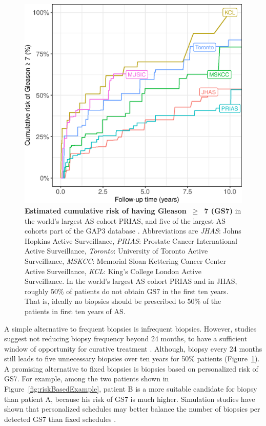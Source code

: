 \begin{figure}[!htb]
\centerline{\includegraphics[width=\columnwidth]{images/npmle_plot.eps}}
\caption{\textbf{Estimated cumulative risk of having Gleason~$\geq$~7 (GS7)} in the world's largest AS cohort PRIAS, and five of the largest AS cohorts part of the GAP3 database \citep{gap3_2018}. Abbreviations are \textit{JHAS}: Johns Hopkins Active Surveillance, \textit{PRIAS}: Prostate Cancer International Active Surveillance, \textit{Toronto}: University of Toronto Active Surveillance, \textit{MSKCC}: Memorial Sloan Kettering Cancer Center Active Surveillance, \textit{KCL}: King's College London Active Surveillance. In the world's largest AS cohort PRIAS and in JHAS, roughly 50\% of patients do not obtain GS7 in the first ten years. That is, ideally no biopsies should be prescribed to 50\% of the patients in first ten years of AS.}
\label{fig:npmle_plot}
\end{figure}

A simple alternative to frequent biopsies is infrequent biopsies. However, studies suggest not reducing biopsy frequency beyond 24 months, to have a sufficient window of opportunity for curative treatment \citep{inoue2018comparative,de2017estimating}. Although, biopsy every 24 months still leads to five unnecessary biopsies over ten years for 50\% patients (Figure~\ref{fig:npmle_plot}). A promising alternative to fixed biopsies is biopsies based on personalized risk of GS7. For example, among the two patients shown in Figure~\ref{fig:riskBasedExample}, patient B is a more suitable candidate for biopsy than patient A, because his risk of GS7 is much higher. Simulation studies have shown that personalized schedules may better balance the number of biopsies per detected GS7 than fixed schedules \citep{tomer2019}. 

